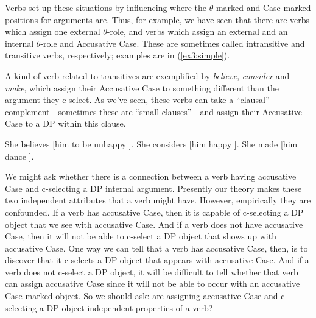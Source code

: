 Verbs set up these situations by influencing where the $\theta$-marked and Case marked positions for arguments are. Thus, for example, we have seen that there are verbs which assign one external $\theta$-role, and verbs which assign an external and an internal $\theta$-role and Accusative Case. These are sometimes called intransitive and transitive verbs, respectively; examples are in (\ref{ex3:simple}).\enlargethispage*{13pt}
\begin{exe}
	\ex \label{ex3:simple} 
	\begin{xlist}
	\end{xlist}
\end{exe}
A kind of verb related to transitives are exemplified by \emph{believe}, \emph{consider} and \emph{make}, which assign their Accusative Case to something different than the argument they c-select. As we've seen, these verbs can take a ``clausal'' complement---sometimes these are ``small clauses''---and assign their Accusative Case to a DP within this clause.
\begin{exe}
	\ex \label{ex3:ecm}
	\begin{xlist}
	\ex She believes [\IP him to be unhappy ].
	\ex She considers [\AP him happy ].
	\ex She made [\VP him dance ].
	\end{xlist} 
\end{exe}

We might ask whether there is a connection between a verb having accusative Case and c-selecting a DP internal argument. %
%
%
%
Presently our theory makes these two independent attributes that a verb might have. However, empirically they are confounded. If a verb has accusative Case, then it is capable of c-selecting a DP object that we see with accusative Case. And if a verb does not have accusative Case, then it will not be able to c-select a DP object that shows up with accusative Case. One way we can tell that a verb has accusative Case, then, is to discover that it c-selects a DP object that appears with accusative Case. And if a verb does not c-select a DP object, it will be difficult to tell whether that verb can assign accusative Case since it will not be able to occur with an accusative Case-marked object. So we should ask: are assigning accusative Case and c-selecting a DP object independent properties of a verb?

